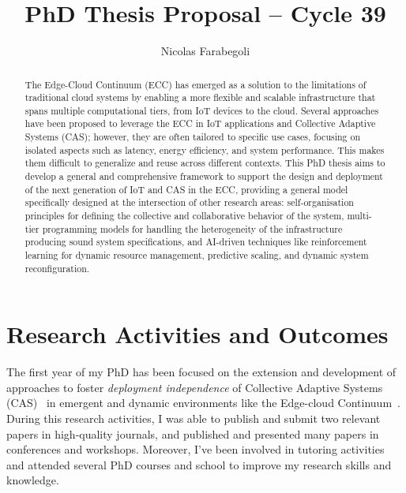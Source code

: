 \documentclass[runningheads]{llncs}
\begin{document}
%
\title{PhD Thesis Proposal -- Cycle 39
}
%
%
\author{Nicolas Farabegoli}
%
%
%
\maketitle              %
%
\begin{abstract}
The Edge-Cloud Continuum (ECC) has emerged as a solution to the limitations of traditional cloud systems by enabling a more flexible and scalable infrastructure that spans multiple computational tiers,
from IoT devices to the cloud.
%
Several approaches have been proposed to leverage the ECC in IoT applications and Collective Adaptive Systems (CAS);
however,
they are often tailored to specific use cases,
focusing on isolated aspects such as latency,
energy efficiency,
and system performance.
%
This makes them difficult to generalize and reuse across different contexts.
%
This PhD thesis aims to develop a general and comprehensive framework to support the design and deployment of the next generation of IoT and CAS in the ECC,
providing a general model specifically designed at the intersection of other research areas:
self-organisation principles for defining the collective and collaborative behavior of the system,
multi-tier programming models for handling the heterogeneity of the infrastructure producing sound system specifications,
and AI-driven techniques like reinforcement learning for dynamic resource management,
predictive scaling,
and dynamic system reconfiguration.

\end{abstract}

\section{Research Activities and Outcomes}

The first year of my PhD has been focused on the extension and development of approaches to foster \emph{deployment independence} of Collective Adaptive Systems (CAS)~\cite{DBLP:conf/birthday/BucchiaroneM19} in emergent and dynamic environments like the Edge-cloud Continuum~\cite{DBLP:journals/access/MoreschiniPLNHT22}.
%
During this research activities,
I was able to publish and submit two relevant papers in high-quality journals,
and published and presented many papers in conferences and workshops.
%
Moreover,
I've been involved in tutoring activities and attended several PhD courses and school to improve my research skills and knowledge.
\end{document}
